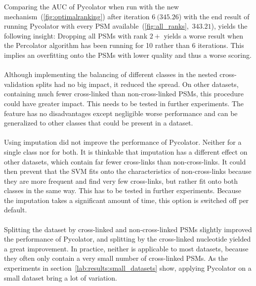 Comparing the AUC of Pycolator when run with the new mechanism~(\ref{fig:optimalranking}) after iteration $6~(345.26$) with the end result of running Pycolator with every PSM available~(\ref{fig:all_ranks},~$343.21$), yields the following insight: Dropping all PSMs with rank $2+$ yields a worse result when the Percolator algorithm has been running for 10 rather than 6 iterations. This implies an overfitting onto the PSMs with lower quality and thus a worse scoring.\\\\
Although implementing the balancing of different classes in the nested cross-validation splits had no big impact, it reduced the spread. On other datasets, containing much fewer cross-linked than non-cross-linked PSMs, this procedure could have greater impact. This needs to be tested in further experiments. The feature has no disadvantages except negligible worse performance and can be generalized to other classes that could be present in a dataset.\\\\
Using imputation did not improve the performance of Pycolator. Neither for a single class nor for both. It is thinkable that imputation has a different effect on other datasets, which contain far fewer cross-links than non-cross-links. It could then prevent that the SVM fits onto the characteristics of non-cross-links because they are more frequent and find very few cross-links, but rather fit onto both classes in the same way. This has to be tested in further experiments. Because the imputation takes a significant amount of time, this option is switched off per default.\\\\
Splitting the dataset by cross-linked and non-cross-linked PSMs slightly improved the performance of Pycolator, and splitting by the cross-linked nucleotide yielded a great improvement. In practice, neither is applicable to most datasets, because they often only contain a very small number of cross-linked PSMs. As the experiments in section~\ref{lab:results:small_datasets} show, applying Pycolator on a small dataset bring a lot of variation.\\
